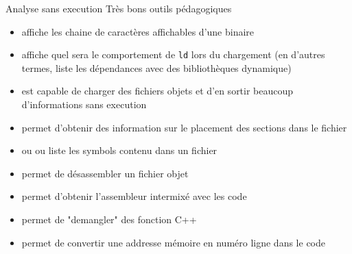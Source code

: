 \begin{frame}[fragile=singleslide]{Analyse sans execution}
  Très bons outils pédagogiques
  \begin{itemize}
  \item  {} affiche  les chaine  de  caractères affichables
    d'une binaire
  \item {} affiche quel  sera le comportement de \verb+ld+ lors
    du chargement (en d'autres  termes, liste les dépendances avec des
    bibliothèques dynamique)
  \item {} est  capable de charger des fichiers  objets et d'en
    sortir beaucoup d'informations sans execution
  \item  {} permet  d'obtenir  des  information sur  le
    placement des sections dans le fichier
  \item  {} ou    ou   liste les
    symbols contenu dans un fichier
  \item {} permet de désassembler un fichier objet
  \item {}  permet d'obtenir l'assembleur intermixé avec
    les code
  \item {} permet de "demangler" des fonction C++
  \item {}  permet de convertir une  addresse mémoire en
    numéro ligne dans le code
  \end{itemize}
\end{frame}


